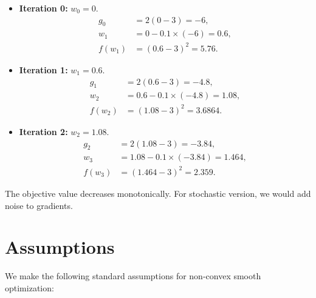 \documentclass{article}
\begin{document}
\begin{itemize}
    \item \textbf{Iteration 0:} $w_0 = 0$.
        \begin{align*}
            g_0 &= 2(0-3) = -6,\\
            w_1 &= 0 - 0.1 \times (-6) = 0.6,\\
            f(w_1) &= (0.6-3)^2 = 5.76.
        \end{align*}
    \item \textbf{Iteration 1:} $w_1 = 0.6$.
        \begin{align*}
            g_1 &= 2(0.6-3) = -4.8,\\
            w_2 &= 0.6 - 0.1 \times (-4.8) = 1.08,\\
            f(w_2) &= (1.08-3)^2 = 3.6864.
        \end{align*}
    \item \textbf{Iteration 2:} $w_2 = 1.08$.
        \begin{align*}
            g_2 &= 2(1.08-3) = -3.84,\\
            w_3 &= 1.08 - 0.1 \times (-3.84) = 1.464,\\
            f(w_3) &= (1.464-3)^2 = 2.359.
        \end{align*}
\end{itemize}
The objective value decreases monotonically. For stochastic version, we would add noise to gradients.

\section*{Assumptions}
We make the following standard assumptions for non-convex smooth optimization:
\end{document}
